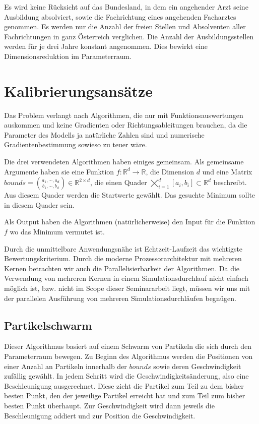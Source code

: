 \documentclass[a4paper,12pt]{article}
\begin{document}
Es wird keine Rücksicht auf das Bundesland, in dem ein angehender Arzt seine Ausbildung absolviert, sowie die Fachrichtung eines angehenden Facharztes genommen. Es werden nur die Anzahl der freien Stellen und Absolventen aller Fachrichtungen in ganz Österreich verglichen. Die Anzahl der Ausbildungsstellen werden für je drei Jahre konstant angenommen. Dies bewirkt eine Dimensionsreduktion im Parameterraum.

\newpage

\section{Kalibrierungsansätze}

Das Problem verlangt nach Algorithmen, die nur mit Funktionsauswertungen auskommen und keine Gradienten oder Richtungsableitungen brauchen, da die Parameter des Modells ja natürliche Zahlen sind und numerische Gradientenbestimmung sowieso zu teuer wäre.

Die drei verwendeten Algorithmen haben einiges gemeinsam. Als gemeinsame Argumente haben sie eine Funktion $f: \mathbb{R}^d \rightarrow \mathbb{R}$, die Dimension $d$ und eine Matrix $bounds = \binom{a_1, \cdots, a_d}{b_1, \cdots, b_d} \in \mathbb{R}^{2\times d}$, die einen Quader $\bigtimes\nolimits_{i=1}^d [a_i, b_i] \subset \mathbb{R}^d$ beschreibt. Aus diesem Quader werden die Startwerte gewählt. Das gesuchte Minimum sollte in diesem Quader sein. 

Als Output haben die Algorithmen (natürlicherweise) den Input für die Funktion $f$ wo das Minimum vermutet ist. 

Durch die unmittelbare Anwendungsnähe ist Echtzeit-Laufzeit das wichtigste Bewertungskriterium. Durch die moderne Prozessorarchitektur mit mehreren Kernen betrachten wir auch die Parallelisierbarkeit der Algorithmen. Da die Verwendung von mehreren Kernen in einem Simulationsdurchlauf nicht einfach möglich ist, bzw. nicht im Scope dieser Seminararbeit liegt, müssen wir uns mit der parallelen Ausführung von mehreren Simulationsdurchläufen begnügen.

\subsection{Partikelschwarm}

Dieser Algorithmus basiert auf einem Schwarm von Partikeln die sich durch den Parameterraum bewegen. Zu Beginn des Algorithmus werden die Positionen von einer Anzahl an Partikeln innerhalb der $bounds$ sowie deren Geschwindigkeit zufällig gewählt. In jedem Schritt wird die Geschwindigkeitsänderung, also eine Beschleunigung ausgerechnet. Diese zieht die Partikel zum Teil zu dem bisher besten Punkt, den der jeweilige Partikel erreicht hat und zum Teil zum bisher besten Punkt überhaupt. Zur Geschwindigkeit wird dann jeweils die Beschleunigung addiert und zur Position die Geschwindigkeit. 
\end{document}
